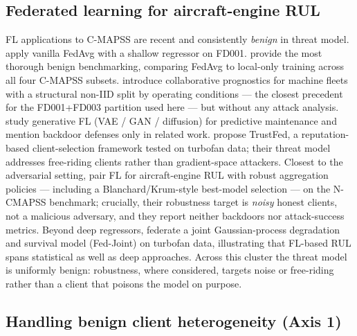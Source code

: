 \documentclass[a4paper,fleqn,doubleblind]{cas-sc}
\begin{document}
\subsection{Federated learning for aircraft-engine RUL}
\label{subsec:related-fl-rul}

FL applications to C-MAPSS are recent and consistently
\emph{benign} in threat model.
\citet{Barbosa2025FLJetEngines} apply vanilla FedAvg with a shallow
regressor on FD001. \citet{Vermelin2024CollabFLRUL} provide the
most thorough benign benchmarking, comparing FedAvg to local-only
training across all four C-MAPSS subsets.
\citet{Pandhare2021FederatedBaseline} introduce collaborative
prognostics for machine fleets with a structural non-IID split
by operating conditions --- the closest precedent for the
FD001+FD003 partition used here --- but without any attack
analysis. \citet{Milasheuski2026GenerativeFL} study generative
FL (VAE / GAN / diffusion) for predictive maintenance and mention
backdoor defenses only in related work. \citet{Rehman2021TrustFed}
propose TrustFed, a reputation-based client-selection framework
tested on turbofan data; their threat model addresses free-riding
clients rather than gradient-space attackers. Closest to the
adversarial setting, \citet{Landau2025CollabRUL} pair FL for
aircraft-engine RUL with robust aggregation policies --- including a
Blanchard/Krum-style best-model selection --- on the N-CMAPSS
benchmark; crucially, their robustness target is \emph{noisy} honest
clients, not a malicious adversary, and they report neither backdoors
nor attack-success metrics. Beyond deep regressors,
\citet{Jeong2025FedJoint} federate a joint Gaussian-process
degradation and survival model (Fed-Joint) on turbofan data,
illustrating that FL-based RUL spans statistical as well as deep
approaches. Across this cluster the threat model is uniformly benign:
robustness, where considered, targets noise or free-riding rather
than a client that poisons the model on purpose.

\subsection{Handling benign client heterogeneity (Axis 1)}
\label{subsec:related-axis1}
\end{document}
